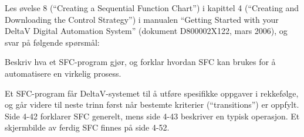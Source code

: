 

Les øvelse 8 (``Creating a Sequential Function Chart'') i kapittel 4 (``Creating and Downloading the Control Strategy'') i manualen ``Getting Started with your DeltaV Digital Automation System'' (dokument D800002X122, mars 2006), og svar på følgende spørsmål:

\vskip 10pt

Beskriv hva et SFC-program gjør, og forklar hvordan SFC kan brukes for å automatisere en virkelig prosess.















Et SFC-program får DeltaV-systemet til å utføre spesifikke oppgaver i rekkefølge, og går videre til neste trinn først når bestemte kriterier (``transitions'') er oppfylt. Side 4-42 forklarer SFC generelt, mens side 4-43 beskriver en typisk operasjon. Et skjermbilde av ferdig SFC finnes på side 4-52.



